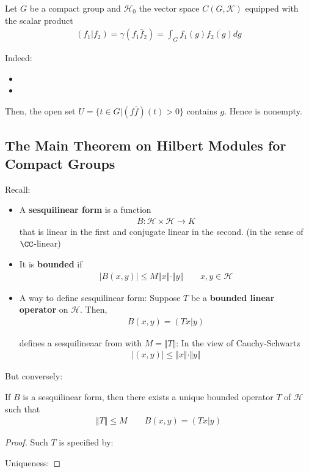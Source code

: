 \documentclass[Total.tex]{subfiles}
\begin{document}
				\begin{example}
					Let $G$ be a compact group and $\mathcal{H}_0$ the vector space $C(G,\mathcal{K})$ equipped with the scalar product
					\begin{gather*}
						(f_1|f_2)=\gamma(f_1\bar{f}_2)=\int_G f_1(g)\overline{f_2(g)}dg
					\end{gather*}
					
					Indeed:
					\begin{itemize}
						\item 
						\item 
					\end{itemize}
					
					Then, the open set $U=\{t\in G|(f\bar{f})(t)>0\}$ contains $g$. Hence is nonempty.
				\end{example}
				\subsection{The Main Theorem on Hilbert Modules for Compact Groups}
					Recall:
					\begin{itemize}
						\item A \textbf{sesquilinear form} is a function
						\begin{gather*}
							B:\mathcal{H}\times \mathcal{H}\rightarrow K
						\end{gather*}
						that is linear in the first and conjugate linear in the second. (in the sense of $\CC$-linear)
						\item  It is \textbf{bounded} if 
						\begin{gather*}
							|B(x,y)|\leq M\Vert x\Vert\cdot \Vert y\Vert\qquad x,y\in \mathcal{H}
						\end{gather*}
						\item A way to define sesquilinear form: Suppose $T$ be a \textbf{bounded linear operator} on $\mathcal{H}$. Then,
						\begin{gather*}
							B(x,y)=(Tx|y)
						\end{gather*}
						
						defines a sesquilineaar from with $M=\Vert T\Vert$: In the view of Cauchy-Schwartz
						\begin{gather*}
							|(x,y)|\leq \Vert x\Vert\cdot \Vert y\Vert 
						\end{gather*}
					\end{itemize}
					But conversely:
					\begin{lemma}
						If $B$ is a sesquilinear form, then there exists a unique bounded operator $T$ of $\mathcal{H}$ such that
						\begin{gather*}
							\Vert T\Vert\leq M\qquad B(x,y)=(Tx|y)
						\end{gather*}
					\end{lemma}
					\begin{proof}
						Such $T$ is specified by:
						
						Uniqueness:
					\end{proof}
					
\end{document}
